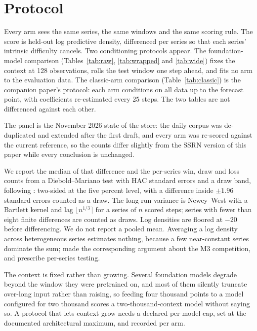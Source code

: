 \documentclass[article]{jss}
\begin{document}
\section{Protocol}\label{sec:protocol}

Every arm sees the same series, the same windows and the same scoring rule. The
score is held-out log predictive density, differenced per series so that each
series' intrinsic difficulty cancels. Two conditioning protocols appear. The
foundation-model comparison (Tables~\ref{tab:raw}, \ref{tab:wrapped} and
\ref{tab:wide}) fixes the context at 128 observations, rolls the test window
one step ahead, and fits no arm to the evaluation data. The classic-arm
comparison (Table~\ref{tab:classic}) is the companion paper's protocol: each
arm conditions on all data up to the forecast point, with coefficients
re-estimated every 25 steps. The two tables are not differenced against each
other.

The panel is the November 2026 state of the store: the daily corpus was
de-duplicated and extended after the first draft, and every arm was re-scored
against the current reference, so the counts differ slightly from the SSRN
version of this paper while every conclusion is unchanged.

We report the median of that difference and the per-series win, draw and loss
counts from a Diebold--Mariano test with HAC standard errors and a draw band,
following \citet{diebold1995comparing}: two-sided at the five percent level,
with a difference inside $\pm 1.96$ standard errors counted as a draw. The
long-run variance is Newey--West with a Bartlett kernel and lag
$\lfloor n^{1/3} \rceil$ for a series of $n$ scored steps; series with fewer
than eight finite differences are counted as draws. Log densities are floored
at $-20$ before differencing. We do not report a pooled mean.
Averaging a log density across heterogeneous series estimates nothing, because a
few near-constant series dominate the sum; \citet{koning2005m3} made the
corresponding argument about the M3 competition, and \citet{hewamalage2023evaluation}
prescribe per-series testing.

The context is fixed rather than growing. Several foundation models degrade
beyond the window they were pretrained on, and most of them silently truncate
over-long input rather than raising, so feeding four thousand points to a model
configured for two thousand scores a two-thousand-context model without saying
so. A protocol that lets context grow needs a declared per-model cap, set at the
documented architectural maximum, and recorded per arm.
\end{document}
